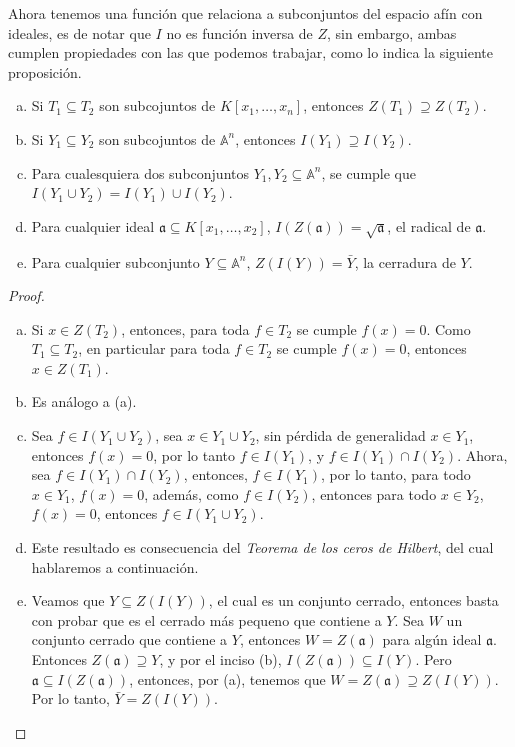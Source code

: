 Ahora tenemos una función que relaciona a subconjuntos del espacio afín con ideales, es de notar que $I$ no es función inversa de $Z$, sin embargo, ambas cumplen propiedades con las que podemos trabajar, como lo indica la siguiente proposición.

\begin{proposition}
\begin{enumerate}[(a)]
\item Si $T_1 \subseteq T_2$ son subcojuntos de $K[x_1,\dots, x_n]$, entonces $Z(T_1) \supseteq Z(T_2)$.
\item Si $Y_1 \subseteq Y_2$ son subcojuntos de $\mathbb{A}^n$, entonces $I(Y_1) \supseteq I(Y_2)$.
\item Para cualesquiera dos subconjuntos $Y_1, Y_2 \subseteq \mathbb{A}^n$, se cumple que $I(Y_1\cup Y_2) = I(Y_1)\cup I(Y_2)$.
\item Para cualquier ideal $\mathfrak{a} \subseteq K[x_1, \dots, x_2]$, $I(Z(\mathfrak{a})) = \sqrt{\mathfrak{a}}$, el radical de $\mathfrak{a}$.
\item Para cualquier subconjunto $Y \subseteq \mathbb{A}^n$, $Z(I(Y)) = \bar{Y}$, la cerradura de $Y$. 
\end{enumerate}
\end{proposition}

\begin{proof}
\begin{enumerate} [(a)]
\item Si $x \in Z(T_2)$, entonces, para toda $f \in T_2$ se cumple $f(x) = 0$. Como $T_1 \subseteq T_2$, en particular para toda $f \in T_2$ se cumple $f(x) = 0$, entonces $x \in Z(T_1)$.
\item Es análogo a (a).
\item Sea $f \in I(Y_1 \cup Y_2)$, sea $x \in Y_1\cup Y_2$, sin pérdida de generalidad $x \in Y_1$, entonces $f(x) = 0$, por lo tanto $f \in I(Y_1)$, y $f \in I(Y_1)\cap I(Y_2)$. Ahora, sea $f \in I(Y_1)\cap I(Y_2)$, entonces, $f \in I(Y_1)$, por lo tanto, para todo $x \in Y_1$, $f(x) = 0$, además, como $f \in I(Y_2)$, entonces para todo $x \in Y_2$, $f(x) = 0$, entonces $f \in I(Y_1 \cup Y_2)$.
\item Este resultado es consecuencia del \emph{Teorema de los ceros de Hilbert}, del cual hablaremos a continuación.
\item Veamos que $Y \subseteq Z(I(Y))$, el cual es un conjunto cerrado, entonces basta con probar que es el cerrado más pequeno que contiene a $Y$. Sea $W$ un conjunto cerrado que contiene a $Y$, entonces $W = Z(\mathfrak{a})$ para algún ideal $\mathfrak{a}$. Entonces $Z(\mathfrak{a}) \supseteq Y$, y por el inciso (b), $I(Z(\mathfrak{a})) \subseteq I(Y)$. Pero $\mathfrak{a} \subseteq I(Z(\mathfrak{a}))$, entonces, por (a), tenemos que $W = Z(\mathfrak{a}) \supseteq Z(I(Y))$. Por lo tanto, $\bar{Y} = Z(I(Y))$.
\end{enumerate}
\end{proof}

